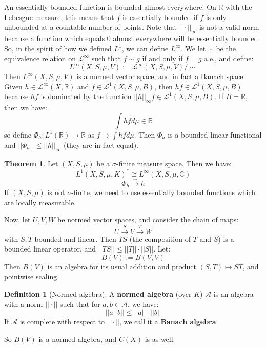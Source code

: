 \documentclass[11pt, oneside]{amsart}   	%
\theoremstyle{definition}
\newtheorem{definition}{Definition}[section]
\newtheorem{theorem}{Theorem}[section]
\begin{document}
	An essentially bounded function is bounded almost everywhere. On $\mathbb R$ with the Lebesgue measure, this means that 
	$f$ is essentially bounded if $f$ is only unbounded at a countable number of points. Note that $||\cdot||_\infty$ is not a valid 
	norm because a function which equals 0 almost everywhere will be essentially bounded. So, in the spirit of how we 
	defined $L^1$, we can define $L^\infty$. We let $\sim$ be the equivalence relation on $\mathcal L^\infty$ such that 
	$f \sim g$ if and only if $f = g$ a.e., and define:
	$$
		L^\infty(X, S, \mu, V) := \mathcal L^\infty(X, S, \mu, V) / \sim
	$$
	Then $L^\infty(X, S, \mu, V)$ is a normed vector space, and in fact a Banach space. Given $h\in\mathcal L^\infty(X, 
	\mathbb R)$ and $f\in\mathcal L^1(X, S, \mu, B)$, then $hf\in\mathcal L^1(X, S, \mu, B)$ because $hf$ is dominated by the 
	function $||h||_\infty f\in\mathcal L^1(X, S, \mu, B)$. If $B = \mathbb R$, then we have:
	$$
		\int hfd\mu\in\mathbb R
	$$
	so define $\Phi_h : L^1(\mathbb R)\rightarrow\mathbb R$ as $f\mapsto\int hfd\mu$. Then $\Phi_h$ is a bounded linear 
	functional and $||\Phi_h||\leq ||h||_\infty$ (they are in fact equal). 
	
	\begin{theorem}
		Let $(X, S, \mu)$ be a $\sigma$-finite measure space. Then we have:
		$$
			L^1(X, S, \mu, K)^*\cong L^\infty(X, S, \mu, \mathbb C)
		$$
		$$
			\Phi_h\xrightarrow{\sim} h
		$$
		If $(X, S, \mu)$ is not $\sigma$-finite, we need to use essentially bounded functions which are locally measurable.
	\end{theorem}
	
	Now, let $U, V, W$ be normed vector spaces, and consider the chain of maps:
	$$
		U\xrightarrow{S} V\xrightarrow{T} W
	$$
	with $S, T$ bounded and linear. Then $TS$ (the composition of $T$ and $S$) is a bounded linear operator, and $||TS||
	\leq ||T||\cdot||S||$. Let:
	$$
		B(V) := B(V, V)
	$$
	Then $B(V)$ is an algebra for its usual addition and product $(S, T)\mapsto ST$, and pointwise scaling.
	
	\begin{definition}[Normed algebra]
		A \textbf{normed algebra} (over $K$) $\mathcal A$ is an algebra with a norm $||\cdot||$ such that for $a, b\in
		\mathcal A$, we have:
		$$
			||a\cdot b||\leq ||a||\cdot||b||
		$$
		If $\mathcal A$ is complete with respect to $||\cdot||$, we call it a \textbf{Banach algebra}.
	\end{definition}
	
	So $B(V)$ is a normed algebra, and $C(X)$ is as well. 
	
\end{document}
